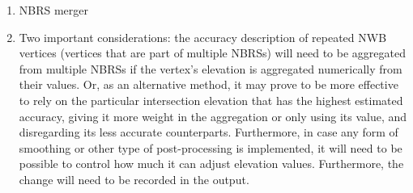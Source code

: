\begin{enumerate}
\begin{enumerate}
    \end{enumerate}
    \item NBRS merger
    \item[] Two important considerations: the accuracy description of repeated NWB vertices (vertices that are part of multiple NBRSs) will need to be aggregated from multiple NBRSs if the vertex’s elevation is aggregated numerically from their values. Or, as an alternative method, it may prove to be more effective to rely on the particular intersection elevation that has the highest estimated accuracy, giving it more weight in the aggregation or only using its value, and disregarding its less accurate counterparts. Furthermore, in case any form of smoothing or other type of post-processing is implemented, it will need to be possible to control how much it can adjust elevation values. Furthermore, the change will need to be recorded in the output.
\end{enumerate}

